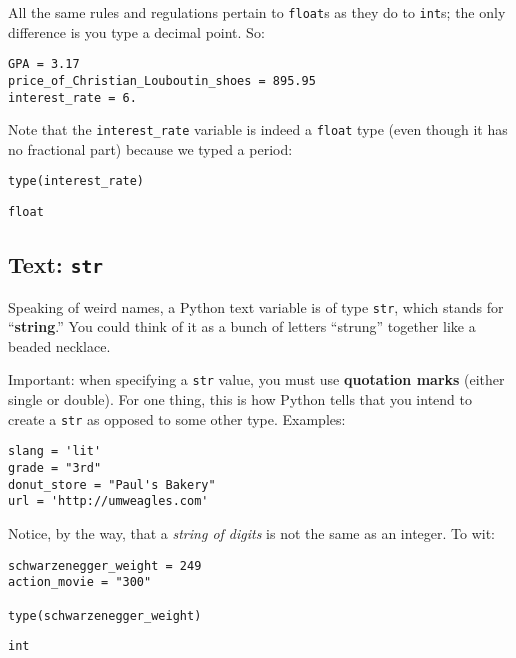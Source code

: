 All the same rules and regulations pertain to \texttt{float}s as they do to
\texttt{int}s; the only difference is you type a decimal point. So:

\begin{Verbatim}[fontsize=\small,samepage=true,frame=single,framesep=3mm]
GPA = 3.17
price_of_Christian_Louboutin_shoes = 895.95
interest_rate = 6.
\end{Verbatim}

Note that the \texttt{interest\_rate} variable is indeed a \texttt{float} type
(even though it has no fractional part) because we typed a period:

\begin{Verbatim}[fontsize=\small,samepage=true,frame=single,framesep=3mm]
type(interest_rate)
\end{Verbatim}
\begin{Verbatim}[fontsize=\small,samepage=true,frame=leftline,framesep=5mm,framerule=1mm]
float
\end{Verbatim}

\subsection{Text: \texttt{str}}

Speaking of weird names, a Python text variable is of type \texttt{str}, which
stands for ``\textbf{string}.'' You could think of it as a bunch of letters
``strung'' together like a beaded necklace.

Important: when specifying a \texttt{str} value, you must use \textbf{quotation
marks} (either single or double). For one thing, this is how Python tells that
you intend to create a \texttt{str} as opposed to some other type. Examples:

\begin{Verbatim}[fontsize=\small,samepage=true,frame=single,framesep=3mm]
slang = 'lit'
grade = "3rd"
donut_store = "Paul's Bakery"
url = 'http://umweagles.com'
\end{Verbatim}

Notice, by the way, that a \textit{string of digits} is not the same as an
integer. To wit:

\begin{Verbatim}[fontsize=\small,samepage=true,frame=single,framesep=3mm]
schwarzenegger_weight = 249
action_movie = "300"

type(schwarzenegger_weight)
\end{Verbatim}
\begin{Verbatim}[fontsize=\small,samepage=true,frame=leftline,framesep=5mm,framerule=1mm]
int
\end{Verbatim}

